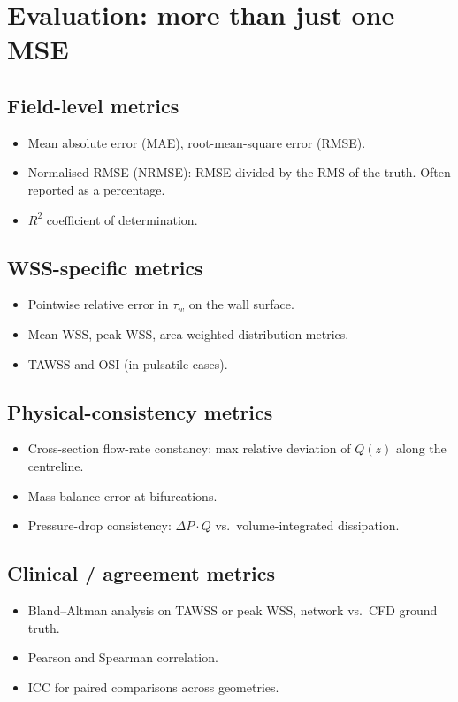 \documentclass[11pt]{article}
\begin{document}
\section{Evaluation: more than just one MSE}

\subsection*{Field-level metrics}
\begin{itemize}[noitemsep]
\item Mean absolute error (MAE), root-mean-square error (RMSE).
\item Normalised RMSE (NRMSE): RMSE divided by the RMS of the truth. Often reported as a percentage.
\item $R^2$ coefficient of determination.
\end{itemize}

\subsection*{WSS-specific metrics}
\begin{itemize}[noitemsep]
\item Pointwise relative error in $\tau_w$ on the wall surface.
\item Mean WSS, peak WSS, area-weighted distribution metrics.
\item TAWSS and OSI (in pulsatile cases).
\end{itemize}

\subsection*{Physical-consistency metrics}
\begin{itemize}[noitemsep]
\item Cross-section flow-rate constancy: max relative deviation of $Q(z)$ along the centreline.
\item Mass-balance error at bifurcations.
\item Pressure-drop consistency: $\Delta P\cdot Q$ vs.\ volume-integrated dissipation.
\end{itemize}

\subsection*{Clinical / agreement metrics}
\begin{itemize}[noitemsep]
\item Bland--Altman analysis on TAWSS or peak WSS, network vs.\ CFD ground truth.
\item Pearson and Spearman correlation.
\item ICC for paired comparisons across geometries.
\end{itemize}
\end{document}
